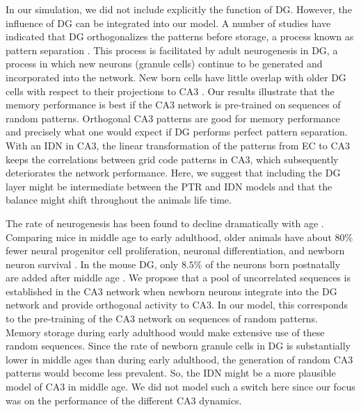 \documentclass[utf8]{frontiersSCNS} %
\begin{document}
In our simulation, we did not include explicitly the function of DG. However, the influence of DG can be integrated into our model. A number of studies have indicated that DG orthogonalizes the patterns before storage, a process known as pattern separation \cite{mcnaughton1987hippocampal, o1994hippocampal, marr1991simple, treves2008mammalian}. This process is facilitated by adult neurogenesis in DG, a process in which new neurons (granule cells) continue to be generated and incorporated into the network. New born cells have little overlap with older DG cells with respect to their projections to CA3 \cite{becker2005computational, wiskott2006functional, aimone2009computational}. Our results illustrate that the memory performance is best if the CA3 network is pre-trained on sequences of random patterns. Orthogonal CA3 patterns are good for memory performance and precisely what one would expect if DG performs perfect pattern separation. With an IDN in CA3, the linear transformation of the patterns from EC to CA3 keeps the correlations between grid code patterns in CA3, which subsequently deteriorates the network performance. Here, we suggest that including the DG layer might be intermediate between the PTR and IDN models and that the balance might shift throughout the animals life time. 

The rate of neurogenesis has been found to decline dramatically with age \cite{ kuhn1996neurogenesis, klempin2007adult}. Comparing mice in middle age to early adulthood, older animals have about $80\%$ fewer neural progenitor cell proliferation, neuronal differentiation, and newborn neuron survival \cite{kuipers2015changes}. In the mouse DG, only $8.5\%$ of the neurons born postnatally are added after middle age \cite{lazic2012modeling}. We propose that a pool of uncorrelated sequences is established in the CA3 network when newborn neurons integrate into the DG network and provide orthogonal activity to CA3. In our model, this corresponds to the pre-training of the CA3 network on sequences of random patterns. Memory storage during early adulthood would make extensive use of these random sequences. Since the rate of newborn granule cells in DG is substantially lower in middle ages than during early adulthood, the generation of random CA3 patterns would become less prevalent. So, the IDN might be a more plausible model of CA3 in middle age. We did not model such a switch here since our focus was on the performance of the different CA3 dynamics.
\end{document}

